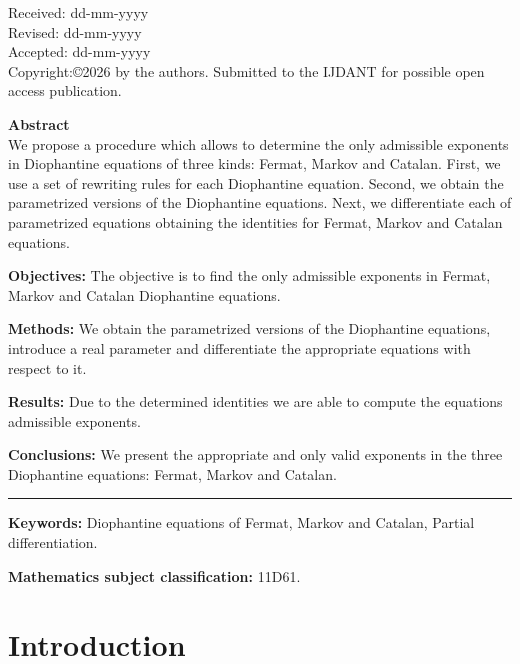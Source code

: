 \documentclass[11pt]{article}
\begin{document}
\noindent
\begin{minipage}[t]{0.32\textwidth}
Received: dd-mm-yyyy\\
Revised: dd-mm-yyyy\\
Accepted: dd-mm-yyyy
\\
{\small Copyright:©2026 by the authors.
Submitted to the IJDANT for possible open access
publication.}
\end{minipage}
\hfill
\begin{minipage}[t]{0.65\textwidth} 

\textbf{Abstract}\\
We propose a procedure which allows to determine the only admissible exponents
in Diophantine equations of three kinds: Fermat, Markov and Catalan.
First, we use a set of rewriting rules for each Diophantine equation.
Second, we obtain the parametrized versions of the Diophantine equations. 
Next, we differentiate each of parametrized equations obtaining the identities
for Fermat, Markov and Catalan equations. 


\textbf{Objectives:} The objective is to find the only admissible exponents in Fermat, Markov
and Catalan Diophantine equations.

\textbf{Methods:} We obtain the parametrized versions of the Diophantine equations, introduce a real parameter
and differentiate the appropriate equations with respect to it.

\textbf{Results:} Due to the determined identities we are able
to compute the equations admissible exponents.

\textbf{Conclusions:} We present the appropriate and only valid exponents in the three Diophantine equations: Fermat, Markov and Catalan.

\vspace{1cm}
\hrule


\end{minipage}

\vspace{1cm}

\textbf{Keywords:} Diophantine equations of Fermat, Markov and Catalan, Partial differentiation.

\textbf{Mathematics subject classification:} 11D61.


\section{Introduction} \label{sec:Intr}
\end{document}
